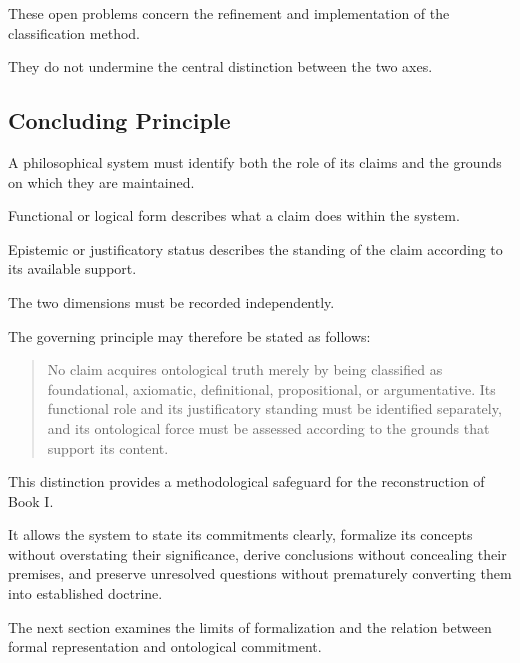 These open
problems concern
the refinement
and implementation
of the classification
method.

They do
not undermine
the central
distinction between
the two
axes.

\subsection{Concluding Principle}

A philosophical
system must
identify both
the role
of its
claims and
the grounds
on which
they are
maintained.

Functional or
logical form
describes what
a claim
does within
the system.

Epistemic or
justificatory status
describes the
standing of
the claim
according to
its available
support.

The two
dimensions must
be recorded
independently.

The governing
principle may
therefore be
stated as
follows:

\begin{quote}
No claim acquires
ontological truth
merely by being
classified as
foundational, axiomatic,
definitional, propositional,
or argumentative.
Its functional
role and
its justificatory
standing must
be identified
separately, and
its ontological
force must
be assessed
according to
the grounds
that support
its content.
\end{quote}

This distinction
provides a
methodological safeguard
for the
reconstruction of
Book I.

It allows
the system
to state
its commitments
clearly, formalize
its concepts
without overstating
their significance,
derive conclusions
without concealing
their premises,
and preserve
unresolved questions
without prematurely
converting them
into established
doctrine.

The next
section examines
the limits
of formalization
and the
relation between
formal representation
and ontological
commitment.

